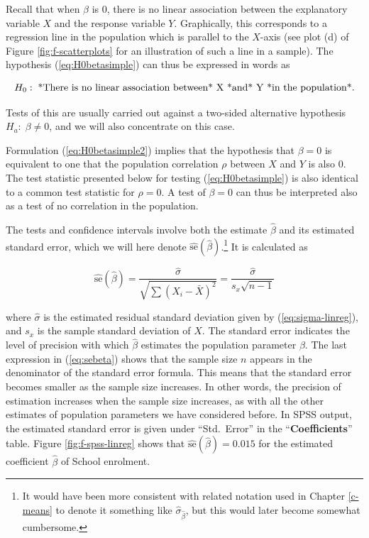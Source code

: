 \documentclass[11pt,a4paper,openany]{book}
\let\rmarkdownfootnote\footnote%
\def\footnote{\protect\rmarkdownfootnote}
\begin{document}
Recall that when \(\beta\) is 0, there is no linear association between
the explanatory variable \(X\) and the response variable \(Y\).
Graphically, this corresponds to a regression line in the population
which is parallel to the \(X\)-axis (see plot (d) of Figure
\ref{fig:f-scatterplots} for an illustration of such a line in a
sample). The hypothesis (\ref{eq:H0betasimple}) can thus be expressed in
words as

\begin{equation}H_{0}:\; \text{*There is no
linear association
between* X \text{*and* }Y\text{ *in the population*}}.
\label{eq:H0betasimple2}\end{equation}

Tests of this are usually carried out against a two-sided alternative
hypothesis \(H_{a}: \; \beta\ne 0\), and we will also concentrate on
this case.

Formulation (\ref{eq:H0betasimple2}) implies that the hypothesis that
\(\beta=0\) is equivalent to one that the population correlation
\(\rho\) between \(X\) and \(Y\) is also 0. The test statistic presented
below for testing (\ref{eq:H0betasimple}) is also identical to a common
test statistic for \(\rho=0\). A test of \(\beta=0\) can thus be
interpreted also as a test of no correlation in the population.

The tests and confidence intervals involve both the estimate
\(\hat{\beta}\) and its estimated standard error, which we will here
denote \(\hat{\text{se}}(\hat{\beta})\).\footnote{It would have been
  more consistent with related notation used in Chapter \ref{c-means} to
  denote it something like \(\hat{\sigma}_{\hat{\beta}}\), but this
  would later become somewhat cumbersome.} It is calculated as

\begin{equation}\hat{\text{se}}(\hat{\beta})=
\frac{\hat{\sigma}}{\sqrt{\sum\left(X_{i}-\bar{X}\right)^{2}}}
=\frac{\hat{\sigma}}{s_{x}\sqrt{n-1}}
\label{eq:sebeta}\end{equation}

where \(\hat{\sigma}\) is the estimated residual standard deviation
given by (\ref{eq:sigma-linreg}), and \(s_{x}\) is the sample standard
deviation of \(X\). The standard error indicates the level of precision
with which \(\hat{\beta}\) estimates the population parameter \(\beta\).
The last expression in (\ref{eq:sebeta}) shows that the sample size
\(n\) appears in the denominator of the standard error formula. This
means that the standard error becomes smaller as the sample size
increases. In other words, the precision of estimation increases when
the sample size increases, as with all the other estimates of population
parameters we have considered before. In SPSS output, the estimated
standard error is given under ``Std.~Error'' in the
``\textbf{Coefficients}'' table. Figure \ref{fig:f-spss-linreg} shows
that \(\hat{\text{se}}(\hat{\beta})=0.015\) for the estimated
coefficient \(\hat{\beta}\) of School enrolment.
\end{document}
